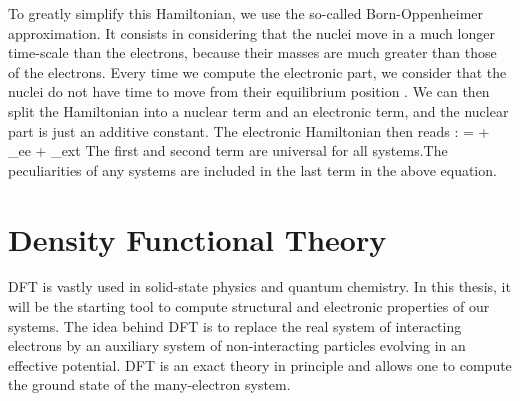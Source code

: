 To greatly simplify this Hamiltonian, we use the so-called Born-Oppenheimer approximation. It consists in considering that the nuclei move in a much longer time-scale than the electrons, because their masses are much greater than those of the electrons. Every time we compute the electronic part, we consider that the nuclei do not have time to move from their equilibrium position \cite{monserrat2018electron}. We can then split the Hamiltonian into a nuclear term and an electronic term, and the nuclear part is just an additive constant. The electronic Hamiltonian then reads :
\be
	 =  + _{ee} + _{ext}
\ee
The first and second term are universal for all systems.The peculiarities of any systems are included in the last term in the above equation.

\section{Density Functional Theory}
\gls{DFT} is vastly used in solid-state physics and quantum chemistry. In this thesis, it will be the starting tool to compute structural and electronic properties of our systems. The idea behind \gls{DFT} is to replace the real system of interacting electrons by an auxiliary system of non-interacting particles evolving in an effective potential. \gls{DFT} is an exact theory in principle and allows one to compute the ground state of the many-electron system.

